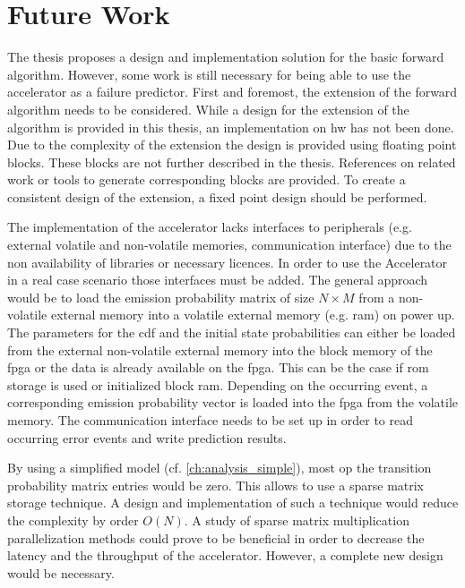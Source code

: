 \documentclass[mscthesis]{usiinfthesis}
\begin{document}
\section{Future Work}
\label{ch:conc_work}

The thesis proposes a design and implementation solution for the basic forward
algorithm. However, some work is still necessary for being able to use the
accelerator as a failure predictor. First and foremost, the extension of the
forward algorithm needs to be considered. While a design for the extension of
the algorithm is provided in this thesis, an implementation on \gls{hw} has not
been done. Due to the complexity of the extension the design is provided using
floating point blocks. These blocks are not further described in the thesis.
References on related work or tools to generate corresponding blocks are
provided. To create a consistent design of the extension, a fixed point design
should be performed.

The implementation of the accelerator lacks interfaces to peripherals (e.g.
external volatile and non-volatile memories, communication interface) due to
the non availability of libraries or necessary licences. In order to use the
Accelerator in a real case scenario those interfaces must be added. The general
approach would be to load the emission probability matrix of size $N \times M$
from a non-volatile external memory into a volatile external memory (e.g.
\gls{ram}) on power up. The parameters for the \gls{cdf} and the initial state
probabilities can either be loaded from the external non-volatile external
memory into the block memory of the \gls{fpga} or the data is already available
on the \gls{fpga}. This can be the case if \gls{rom} storage is used or
initialized block \gls{ram}.  Depending on the occurring event, a corresponding
emission probability vector is loaded into the \gls{fpga} from the volatile
memory. The communication interface needs to be set up in order to read
occurring error events and write prediction results.

By using a simplified model (cf. \ref{ch:analysis_simple}), most op the transition probability matrix entries
would be zero. This allows to use a sparse matrix storage technique. A design
and implementation of such a technique would reduce the complexity by order
$O(N)$. A study of sparse matrix multiplication parallelization methods could
prove to be beneficial in order to decrease the latency and the throughput
of the accelerator. However, a complete new design would be necessary.
\end{document}

